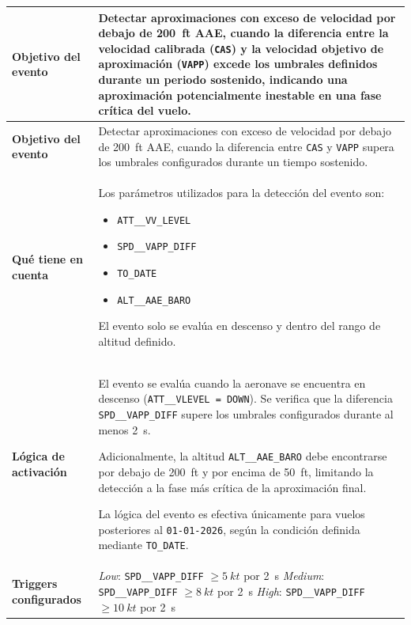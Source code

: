 \documentclass[11pt,a4paper]{article}
\begin{document}
	\renewcommand{\arraystretch}{1.3}
	\begin{longtable}{p{5cm} p{9.5cm}}
		\hline
		\textbf{Objetivo del evento} &
		Detectar aproximaciones con exceso de velocidad por debajo de \SI{200}{ft} AAE, cuando la diferencia entre la velocidad calibrada (\texttt{CAS}) y la velocidad objetivo de aproximación (\texttt{VAPP}) excede los umbrales definidos durante un periodo sostenido, indicando una aproximación potencialmente inestable en una fase crítica del vuelo. \\
		\hline
		\endfirsthead
		
		\hline
		\textbf{Objetivo del evento} &
		Detectar aproximaciones con exceso de velocidad por debajo de \SI{200}{ft} AAE, cuando la diferencia entre \texttt{CAS} y \texttt{VAPP} supera los umbrales configurados durante un tiempo sostenido. \\
		\hline
		\endhead
		
		\hline
		\endfoot
		
		\hline
		\endlastfoot
		
		\textbf{Qué tiene en cuenta} &
		Los parámetros utilizados para la detección del evento son:
		\begin{itemize}
			\item \texttt{ATT\_\_VV\_LEVEL}
			\item \texttt{SPD\_\_VAPP\_DIFF}
			\item \texttt{TO\_DATE}
			\item \texttt{ALT\_\_AAE\_BARO}
		\end{itemize}
		El evento solo se evalúa en descenso y dentro del rango de altitud definido. \\
		\hline
		
		\textbf{Lógica de activación} &
		El evento se evalúa cuando la aeronave se encuentra en descenso (\texttt{ATT\_\_VLEVEL = DOWN}).  
		Se verifica que la diferencia \texttt{SPD\_\_VAPP\_DIFF} supere los umbrales configurados durante al menos \SI{2}{s}.  
		
		Adicionalmente, la altitud \texttt{ALT\_\_AAE\_BARO} debe encontrarse por debajo de \SI{200}{ft} y por encima de \SI{50}{ft}, limitando la detección a la fase más crítica de la aproximación final.  
		
		La lógica del evento es efectiva únicamente para vuelos posteriores al \texttt{01-01-2026}, según la condición definida mediante \texttt{TO\_DATE}. \\
		\hline
		
		\textbf{Triggers configurados} &
		\textit{Low}: \texttt{SPD\_\_VAPP\_DIFF} $\ge \SI{5}{kt}$ por \SI{2}{s} \newline
		\textit{Medium}: \texttt{SPD\_\_VAPP\_DIFF} $\ge \SI{8}{kt}$ por \SI{2}{s} \newline
		\textit{High}: \texttt{SPD\_\_VAPP\_DIFF} $\ge \SI{10}{kt}$ por \SI{2}{s} \\
		\hline
		

\end{longtable}
\end{document}
